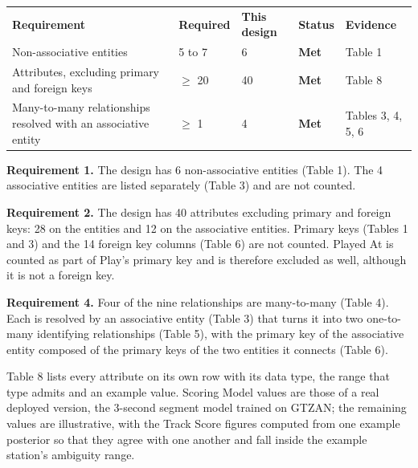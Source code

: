 \documentclass[11pt]{article}
\begin{document}
\begin{longtable}{|L{2.20in}|L{0.75in}|L{0.95in}|L{0.70in}|L{1.45in}|}
\hline
{} \\ \hline
{}\textbf{Requirement} & \textbf{Required} & \textbf{This design} & \textbf{Status} & \textbf{Evidence} \\ \hline
Non-associative entities & 5 to 7 & 6 & \textcolor{relc}{\textbf{Met}} & Table 1 \\ \hline
Attributes, excluding primary and foreign keys & $\geq$ 20 & 40 & \textcolor{relc}{\textbf{Met}} & Table 8 \\ \hline
Many-to-many relationships resolved with an associative entity & $\geq$ 1 & 4 & \textcolor{relc}{\textbf{Met}} & Tables 3, 4, 5, 6 \\ \hline
\end{longtable}

\textbf{Requirement 1.} The design has 6 non-associative entities (Table 1). The 4
associative entities are listed separately (Table 3) and are not counted.

\textbf{Requirement 2.} The design has 40 attributes excluding primary and foreign keys:
28 on the entities and 12 on the associative entities. Primary keys (Tables 1 and 3) and the
14 foreign key columns (Table 6) are not counted. Played At is counted as part of Play's primary key
and is therefore excluded as well, although it is not a foreign key.

\textbf{Requirement 4.} Four of the nine relationships are many-to-many (Table 4). Each is
resolved by an associative entity (Table 3) that turns it into two one-to-many identifying
relationships (Table 5), with the primary key of the associative entity composed of the primary
keys of the two entities it connects (Table 6).

Table 8 lists every attribute on its own row with its data type, the range that type
admits and an example value. Scoring Model values are those of a real deployed version, the
3-second segment model trained on GTZAN; the remaining values are illustrative, with the
Track Score figures computed from one example posterior so that they agree with one another
and fall inside the example station's ambiguity range.
\end{document}
